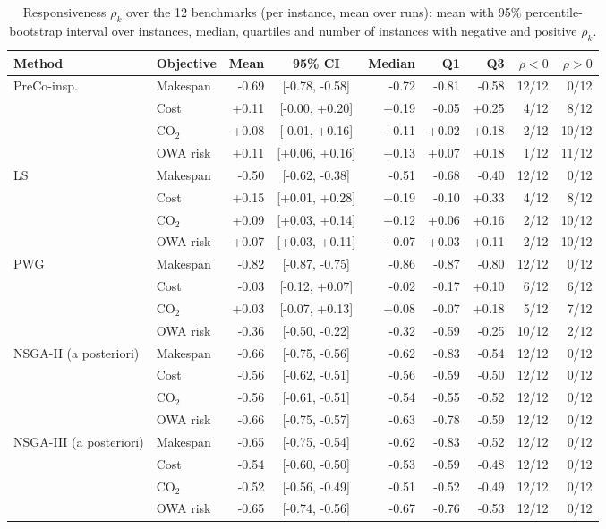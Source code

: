 \begin{table}[htbp]
\centering
\caption{Responsiveness $\rho_k$ over the 12 benchmarks (per instance, mean over runs): mean with 95\% percentile-bootstrap interval over instances, median, quartiles and number of instances with negative and positive $\rho_k$.}
\label{tab:respinst}
\scriptsize
\setlength{\tabcolsep}{4pt}
\begin{tabular}{llrcrrrrr}
\toprule
Method & Objective & Mean & 95\% CI & Median & Q1 & Q3 & $\rho<0$ & $\rho>0$ \\
\midrule
PreCo-insp. & Makespan & -0.69 & [-0.78, -0.58] & -0.72 & -0.81 & -0.58 & 12/12 & 0/12 \\
 & Cost & +0.11 & [-0.00, +0.20] & +0.19 & -0.05 & +0.25 & 4/12 & 8/12 \\
 & CO$_2$ & +0.08 & [-0.01, +0.16] & +0.11 & +0.02 & +0.18 & 2/12 & 10/12 \\
 & OWA risk & +0.11 & [+0.06, +0.16] & +0.13 & +0.07 & +0.18 & 1/12 & 11/12 \\
\midrule
LS & Makespan & -0.50 & [-0.62, -0.38] & -0.51 & -0.68 & -0.40 & 12/12 & 0/12 \\
 & Cost & +0.15 & [+0.01, +0.28] & +0.19 & -0.10 & +0.33 & 4/12 & 8/12 \\
 & CO$_2$ & +0.09 & [+0.03, +0.14] & +0.12 & +0.06 & +0.16 & 2/12 & 10/12 \\
 & OWA risk & +0.07 & [+0.03, +0.11] & +0.07 & +0.03 & +0.11 & 2/12 & 10/12 \\
\midrule
PWG & Makespan & -0.82 & [-0.87, -0.75] & -0.86 & -0.87 & -0.80 & 12/12 & 0/12 \\
 & Cost & -0.03 & [-0.12, +0.07] & -0.02 & -0.17 & +0.10 & 6/12 & 6/12 \\
 & CO$_2$ & +0.03 & [-0.07, +0.13] & +0.08 & -0.07 & +0.18 & 5/12 & 7/12 \\
 & OWA risk & -0.36 & [-0.50, -0.22] & -0.32 & -0.59 & -0.25 & 10/12 & 2/12 \\
\midrule
NSGA-II (a posteriori) & Makespan & -0.66 & [-0.75, -0.56] & -0.62 & -0.83 & -0.54 & 12/12 & 0/12 \\
 & Cost & -0.56 & [-0.62, -0.51] & -0.56 & -0.59 & -0.50 & 12/12 & 0/12 \\
 & CO$_2$ & -0.56 & [-0.61, -0.51] & -0.54 & -0.55 & -0.52 & 12/12 & 0/12 \\
 & OWA risk & -0.66 & [-0.75, -0.57] & -0.63 & -0.78 & -0.59 & 12/12 & 0/12 \\
\midrule
NSGA-III (a posteriori) & Makespan & -0.65 & [-0.75, -0.54] & -0.62 & -0.83 & -0.52 & 12/12 & 0/12 \\
 & Cost & -0.54 & [-0.60, -0.50] & -0.53 & -0.59 & -0.48 & 12/12 & 0/12 \\
 & CO$_2$ & -0.52 & [-0.56, -0.49] & -0.51 & -0.52 & -0.49 & 12/12 & 0/12 \\
 & OWA risk & -0.65 & [-0.74, -0.56] & -0.67 & -0.76 & -0.53 & 12/12 & 0/12 \\
\bottomrule
\end{tabular}
\end{table}
